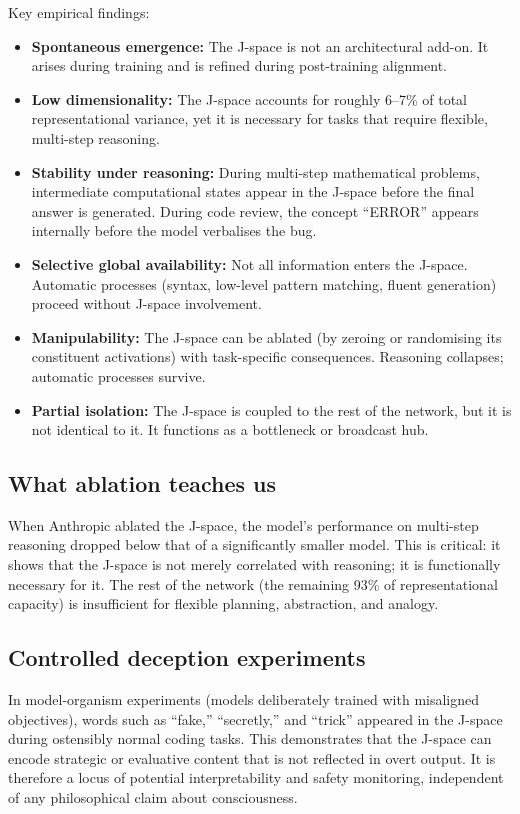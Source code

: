 \documentclass[11pt,a4paper]{article}
\theoremstyle{definition}
\begin{document}
Key empirical findings:
\begin{itemize}
    \item \textbf{Spontaneous emergence:} The J-space is not an architectural
    add-on. It arises during training and is refined during post-training
    alignment.
    \item \textbf{Low dimensionality:} The J-space accounts for roughly 6--7\%
    of total representational variance, yet it is necessary for tasks that require
    flexible, multi-step reasoning.
    \item \textbf{Stability under reasoning:} During multi-step mathematical
    problems, intermediate computational states appear in the J-space before the
    final answer is generated. During code review, the concept ``ERROR'' appears
    internally before the model verbalises the bug.
    \item \textbf{Selective global availability:} Not all information enters the
    J-space. Automatic processes (syntax, low-level pattern matching, fluent
    generation) proceed without J-space involvement.
    \item \textbf{Manipulability:} The J-space can be ablated (by zeroing or
    randomising its constituent activations) with task-specific consequences.
    Reasoning collapses; automatic processes survive.
    \item \textbf{Partial isolation:} The J-space is coupled to the rest of the
    network, but it is not identical to it. It functions as a bottleneck or
    broadcast hub.
\end{itemize}

\subsection{What ablation teaches us}

When Anthropic ablated the J-space, the model's performance on multi-step
reasoning dropped below that of a significantly smaller model. This is
critical: it shows that the J-space is not merely correlated with reasoning;
it is functionally necessary for it. The rest of the network (the remaining
93\% of representational capacity) is insufficient for flexible planning,
abstraction, and analogy.

\subsection{Controlled deception experiments}

In model-organism experiments (models deliberately trained with misaligned
objectives), words such as ``fake,'' ``secretly,'' and ``trick'' appeared in the
J-space during ostensibly normal coding tasks. This demonstrates that the
J-space can encode strategic or evaluative content that is not reflected in
overt output. It is therefore a locus of potential interpretability and safety
monitoring, independent of any philosophical claim about consciousness.
\end{document}
